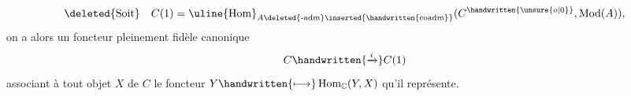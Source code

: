 \[
\deleted{\text{Soit}}\quad C(1)=\uline{\operatorname{Hom}}_{A\deleted{\text{-}\mathrm{adm}}\inserted{\handwritten{\mathrm{coadm}}}}(C^{\handwritten{\unsure{o|0}}},\operatorname{Mod}(A)),
\]
on a alors un foncteur pleinement fidèle canonique
\[
C\handwritten{\xrightarrow{i}}C(1)
\]
associant à tout objet $X$ de $C$ le foncteur $Y\handwritten{\longmapsto}\operatorname{Hom}_{\mathbb{C}}(Y,X)$ qu'il représente. 
